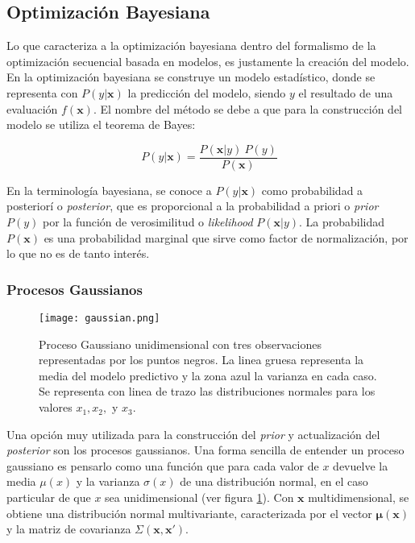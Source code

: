 \subsection*{Optimización Bayesiana}

Lo que caracteriza a la optimización bayesiana dentro del formalismo de la optimización secuencial basada en modelos, es justamente la creación del modelo.
En la optimización bayesiana se construye un modelo estadístico, donde se representa con  $P(y|\textbf{x})$ la predicción del modelo, siendo $y$ el resultado de una evaluación $f(\textbf{x})$. El nombre del método se debe a que para la construcción del modelo se utiliza el teorema de Bayes:
  
 \[
 P(y|\textbf{x}) = \frac{P(\textbf{x}|y) \ P(y)}{P(\textbf{x})}
 \]
 
En la terminología bayesiana, se conoce a $P(y|\textbf{x})$ como probabilidad a posteriorí o \textit{posterior}, que es proporcional a la probabilidad a priori o \textit{prior} $P(y)$ por la función de verosimilitud o \textit{likelihood} $P(\textbf{x}|y)$. La probabilidad $P(\textbf{x})$ es una probabilidad marginal que sirve como factor de normalización, por lo que no es de tanto interés.


\subsubsection*{Procesos Gaussianos}

\begin{figure}[h!]
\centering
\texttt{[image: gaussian.png]}
\caption{Proceso Gaussiano unidimensional con tres observaciones representadas por los puntos negros. La linea gruesa representa la media del modelo predictivo y la zona azul la varianza en cada caso. Se representa con linea de trazo las distribuciones normales para los valores $x_1, x_2,$ y $x_3$\cite{https://doi.org/10.48550/arxiv.1012.2599}.}
\label{fig:gaussian}
\end{figure}

Una opción muy utilizada para la construcción del \textit{prior} y actualización del \textit{posterior} son los procesos gaussianos. Una forma sencilla de entender un proceso gaussiano es pensarlo como una función que para cada valor de $x$ devuelve la media $\mu(x)$ y la varianza $\sigma(x)$ de una distribución normal, en el caso particular de que $x$ sea unidimensional (ver figura \ref{fig:gaussian}). Con $\textbf{x}$ multidimensional, se obtiene una distribución normal multivariante, caracterizada por el vector $\bm{\mu}(\textbf{x})$ y la matriz de covarianza $\Sigma(\textbf{x}, \textbf{x}')$.

